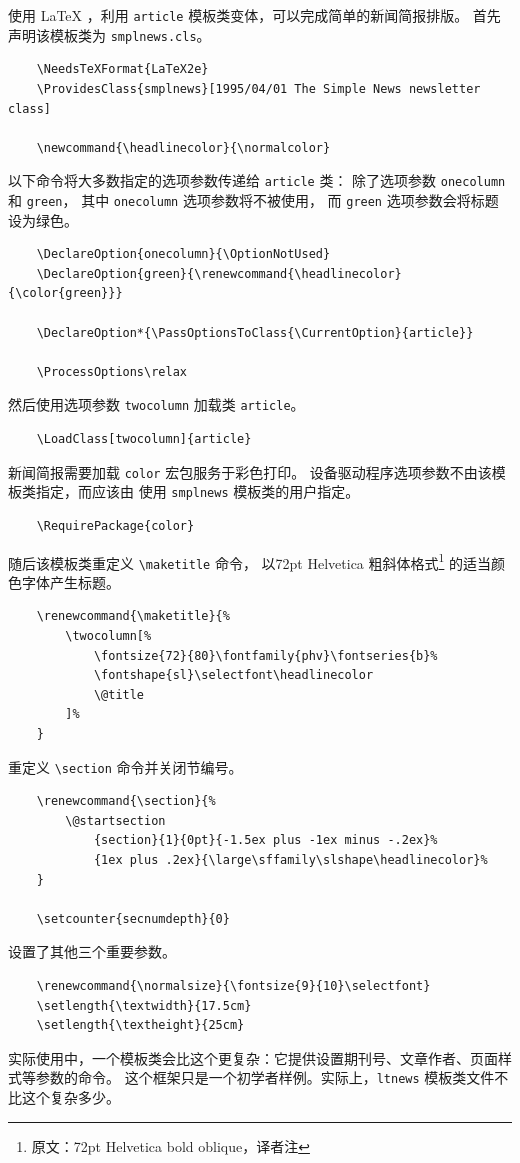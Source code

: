 \documentclass{ltxguide}[1995/11/28]
\begin{document}
使用 \LaTeX{} ，利用 \verb|article| 模板类变体，可以完成简单的新闻简报排版。
首先声明该模板类为 \verb|smplnews.cls|。
\begin{verbatim}
	\NeedsTeXFormat{LaTeX2e}
	\ProvidesClass{smplnews}[1995/04/01 The Simple News newsletter class]

	\newcommand{\headlinecolor}{\normalcolor}
\end{verbatim}
以下命令将大多数指定的选项参数传递给 \verb|article| 类：
除了选项参数 \verb|onecolumn| 和 \verb|green|，
其中 \verb|onecolumn| 选项参数将不被使用，
而 \verb|green| 选项参数会将标题设为绿色。
\begin{verbatim}
	\DeclareOption{onecolumn}{\OptionNotUsed}
	\DeclareOption{green}{\renewcommand{\headlinecolor}{\color{green}}}

	\DeclareOption*{\PassOptionsToClass{\CurrentOption}{article}}

	\ProcessOptions\relax
\end{verbatim}
然后使用选项参数 \verb|twocolumn| 加载类 \verb|article|。
\begin{verbatim}
	\LoadClass[twocolumn]{article}
\end{verbatim}
新闻简报需要加载 \verb|color| 宏包服务于彩色打印。
设备驱动程序选项参数不由该模板类指定，而应该由
使用 \verb|smplnews| 模板类的用户指定。
\begin{verbatim}
	\RequirePackage{color}
\end{verbatim}
随后该模板类重定义 \verb|\maketitle| 命令，
以72pt Helvetica 粗斜体格式\footnote{原文：72pt Helvetica bold oblique，译者注}
的适当颜色字体产生标题。
\begin{verbatim}
	\renewcommand{\maketitle}{%
		\twocolumn[%
			\fontsize{72}{80}\fontfamily{phv}\fontseries{b}%
			\fontshape{sl}\selectfont\headlinecolor
			\@title
		]%
	}
\end{verbatim}
重定义 \verb|\section| 命令并关闭节编号。
\begin{verbatim}
	\renewcommand{\section}{%
		\@startsection
			{section}{1}{0pt}{-1.5ex plus -1ex minus -.2ex}%
			{1ex plus .2ex}{\large\sffamily\slshape\headlinecolor}%
	}

	\setcounter{secnumdepth}{0}
\end{verbatim}
设置了其他三个重要参数。
\begin{verbatim}
	\renewcommand{\normalsize}{\fontsize{9}{10}\selectfont}
	\setlength{\textwidth}{17.5cm}
	\setlength{\textheight}{25cm}
\end{verbatim}
实际使用中，一个模板类会比这个更复杂：它提供设置期刊号、文章作者、页面样式等参数的命令。
这个框架只是一个初学者样例。实际上，\verb|ltnews| 模板类文件不比这个复杂多少。
\end{document}
